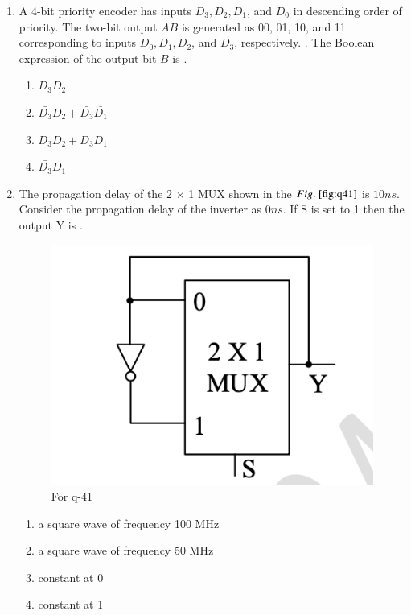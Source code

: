 \documentclass[journal,12pt,onecolumn]{IEEEtran}
\theoremstyle{remark}
\begin{document}
\begin{enumerate}
\item A 4-bit priority encoder has inputs $D_3, D_2, D_1$, and $D_0$ in descending order of priority. The two-bit output $AB$ is generated as 00, 01, 10, and 11 corresponding to inputs $D_0, D_1, D_2$, and $D_3$, respectively. . The Boolean expression of the output bit $B$ is \underline{\hspace{2cm}}.
\hfill{}
\begin{multicols}{4}
\begin{enumerate}
    \item $\bar{D_3} \bar{D_2}$
    \item $\bar{D_3} D_2 + \bar{D_3} \bar{D_1}$
    \item $D_3 \bar{D_2} + \bar{D_3} D_1$
    \item $\bar{D_3} D_1$
\end{enumerate}
\end{multicols}


\item The propagation delay of the 2 $\times$ 1 MUX shown in the $\figref{fig:q41}$ is $10 ns$. Consider the propagation delay of the inverter as $0 ns$. If S is set to 1 then the output Y is \underline{\hspace{2cm}}.
\begin{figure}[H]
    \centering
    \includegraphics[width=0.4\columnwidth]{q41.png}
    \caption{For q-41}
    \label{fig:q41}
\end{figure}
\hfill{}
\begin{multicols}{2}
\begin{enumerate}
    \item a square wave of frequency 100 MHz
    \item a square wave of frequency 50 MHz
    \item constant at 0
    \item constant at 1
\end{enumerate} 
\end{multicols}



\end{enumerate}
\end{document}

